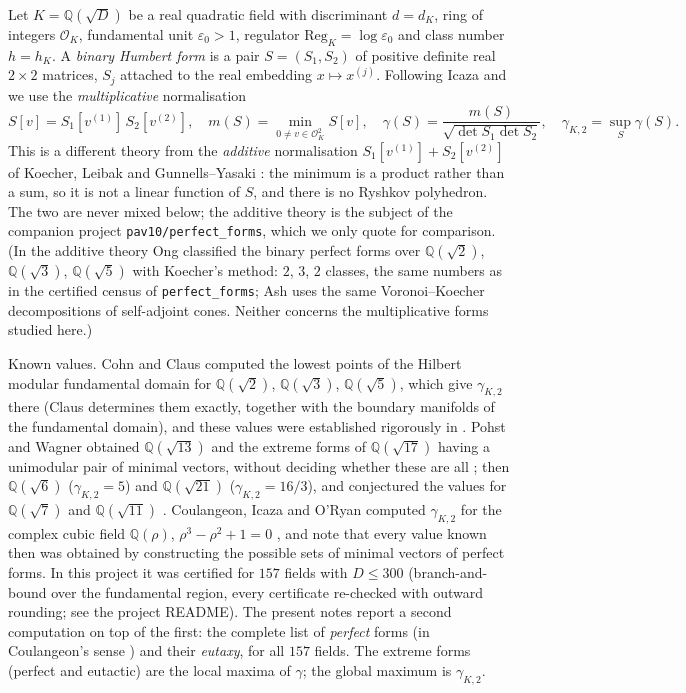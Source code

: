 \documentclass[11pt]{amsart}
\theoremstyle{definition}
\theoremstyle{remark}
\newcommand{\Q}{\mathbb{Q}}
\newcommand{\OK}{\mathcal{O}_K}
\newcommand{\Reg}{\mathrm{Reg}_K}
\newcommand{\gK}{\gamma_{K,2}}
\begin{document}
Let $K=\Q(\sqrt D)$ be a real quadratic field with discriminant $d=d_K$, ring of integers
$\OK$, fundamental unit $\varepsilon_0>1$, regulator $\Reg=\log\varepsilon_0$ and class number
$h=h_K$.  A \emph{binary Humbert form} is a pair $S=(S_1,S_2)$ of positive definite real
$2\times2$ matrices, $S_j$ attached to the real embedding $x\mapsto x^{(j)}$.  Following
Icaza and \cite{BCIO,PW05,PW09} we use the \emph{multiplicative} normalisation
\begin{equation}\label{eq:mult}
S[v]=S_1[v^{(1)}]\,S_2[v^{(2)}],\quad m(S)=\min_{0\ne v\in\OK^2}S[v],\quad
\gamma(S)=\frac{m(S)}{\sqrt{\det S_1\det S_2}},\quad \gK=\sup_S\gamma(S).
\end{equation}
This is a different theory from the \emph{additive} normalisation
$S_1[v^{(1)}]+S_2[v^{(2)}]$ of Koecher, Leibak and Gunnells--Yasaki
\cite{Leibak,LeibakThesis,GY}: the minimum is a product rather than a sum, so it is not a
linear function of $S$, and there is no Ryshkov polyhedron.  The two are never mixed below;
the additive theory is the subject of the companion project \texttt{pav10/perfect\_forms},
which we only quote for comparison.  (In the additive theory Ong \cite{Ong} classified the binary
perfect forms over $\Q(\sqrt2)$, $\Q(\sqrt3)$, $\Q(\sqrt5)$ with Koecher's method: $2$, $3$, $2$
classes, the same numbers as in the certified census of \texttt{perfect\_forms}; Ash \cite{Ash}
uses the same Voronoi--Koecher decompositions of self-adjoint cones.  Neither concerns the
multiplicative forms studied here.)

Known values.  Cohn \cite{Cohn1} and Claus \cite{Claus} computed the lowest points of the
Hilbert modular fundamental domain for $\Q(\sqrt2)$, $\Q(\sqrt3)$, $\Q(\sqrt5)$, which give $\gK$
there (Claus determines them exactly, together with the boundary manifolds of the fundamental
domain), and these values were established rigorously in \cite{BCIO}.  Pohst and Wagner obtained
$\Q(\sqrt{13})$ and the extreme forms of $\Q(\sqrt{17})$ having a unimodular pair of minimal
vectors, without deciding whether these are all \cite{PW05}; then $\Q(\sqrt6)$ ($\gK=5$) and
$\Q(\sqrt{21})$ ($\gK=16/3$), and conjectured the values for $\Q(\sqrt7)$ and $\Q(\sqrt{11})$
\cite{PW09}.  Coulangeon, Icaza and O'Ryan computed $\gK$ for the complex cubic field
$\Q(\rho)$, $\rho^3-\rho^2+1=0$ \cite{CIO}, and note that every value known then was obtained by
constructing the possible sets of minimal vectors of perfect forms.  In this project it was certified for $157$ fields with $D\le300$
(branch-and-bound over the fundamental region, every certificate re-checked with outward
rounding; see the project README).  The present notes report a second computation on top of
the first: the complete list of \emph{perfect} forms (in Coulangeon's sense
\cite{Coulangeon}) and their \emph{eutaxy}, for all $157$ fields.  The extreme forms (perfect
and eutactic) are the local maxima of $\gamma$; the global maximum is $\gK$.
\end{document}
